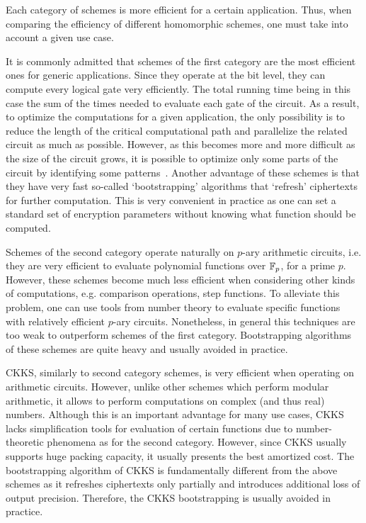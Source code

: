 Each category of schemes is more efficient for a certain application. 
Thus, when comparing the efficiency of different homomorphic schemes, one must take into account a given use case.

It is commonly admitted that schemes of the first category are the most efficient ones for generic applications. 
Since they operate at the bit level, they can compute every logical gate very efficiently. 
The total running time being in this case the sum of the times needed to evaluate each gate of the circuit. 
As a result, to optimize the computations for a given application, the only possibility is to reduce the length of the critical computational path and parallelize the related circuit as much as possible. 
However, as this becomes more and more difficult as the size of the circuit grows, it is possible to optimize only some parts of the circuit by identifying some patterns~\cite{ACS20}.
Another advantage of these schemes is that they have very fast so-called `bootstrapping' algorithms that `refresh' ciphertexts for further computation.
This is very convenient in practice as one can set a standard set of encryption parameters without knowing what function should be computed. 

Schemes of the second category operate naturally on $p$-ary arithmetic circuits, i.e. they are very efficient to evaluate polynomial functions over $\mathbb{F}_p$, for a prime $p$.
However, these schemes become much less efficient when considering other kinds of computations, e.g. comparison operations, step functions. 
To alleviate this problem, one can use tools from number theory to evaluate specific functions with relatively efficient $p$-ary circuits. 
Nonetheless, in general this techniques are too weak to outperform schemes of the first category.
Bootstrapping algorithms of these schemes are quite heavy and usually avoided in practice. 

CKKS, similarly to second category schemes, is very efficient when operating on arithmetic circuits. 
However, unlike other schemes which perform modular arithmetic, it allows to perform computations on complex (and thus real) numbers. 
Although this is an important advantage for many use cases, CKKS lacks simplification tools for evaluation of certain functions due to number-theoretic phenomena as for the second category. 
However, since CKKS usually supports huge packing capacity, it usually presents the best amortized cost.
The bootstrapping algorithm of CKKS is fundamentally different from the above schemes as it refreshes ciphertexts only partially and introduces additional loss of output precision.
Therefore, the CKKS bootstrapping is usually avoided in practice. 

